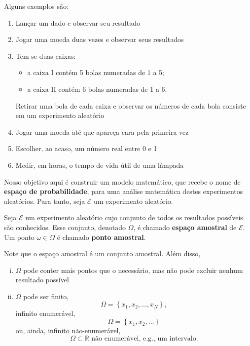 \documentclass[../Notas.tex]{subfiles}
\begin{document}
\begin{examples} Alguns exemplos são:
\begin{enumerate}[1)]
    \item Lançar um dado e observar seu resultado
    \item Jogar uma moeda duas vezes e observar seus resultados
    \item Tem-se duas caixas:
    \begin{itemize}
        \item a caixa I contém 5 bolas numeradas de 1 a 5;
        \item a caixa II contém 6 bolas numeradas de 1 a 6.
    \end{itemize}
    Retirar uma bola de cada caixa e observar os números de cada bola consiste em um experimento aleatório
    \item Jogar uma moeda até que apareça cara pela primeira vez
    \item Escolher, ao acaso, um número real entre 0 e 1
    \item Medir, em horas, o tempo de vida útil de uma lâmpada
\end{enumerate}
\end{examples}

Nosso objetivo aqui é construir um modelo matemático, que recebe o nome de {\bf espaço de probabilidade}, para uma análise matemática destes experimentos aleatórios. Para tanto, seja $\mathcal{E}$ um experimento aleatório.

\begin{definition}
Seja $\mathcal{E}$ um experimento aleatório cujo conjunto de todos os resultados possíveis são conhecidos. Esse conjunto, denotado $\Omega$, é chamado {\bf espaço amostral} de $\mathcal{E}$. Um ponto $\omega\in\Omega$ é chamado {\bf ponto amostral}.
\end{definition}

\begin{remarks} Note que o espaço amostral é um conjunto amostral. Além disso,
\begin{enumerate}[(i)]
    \item $\Omega$ pode conter mais pontos que o necessário, mas não pode excluir nenhum resultado possível
    \item $\Omega$ pode ser finito,
    $$
    \Omega = \left\{ x_1, x_2, \dots, x_N \right\},
    $$
    infinito enumerável,
    $$
    \Omega = \left\{ x_1, x_2, \dots \right\}
    $$
    ou, ainda, infinito não-enumerável,
    $$
    \Omega\subset\mathbb{R} \text{ não enumerável, e.g., um intervalo.}
    $$
\end{enumerate}
\end{remarks}
\end{document}
